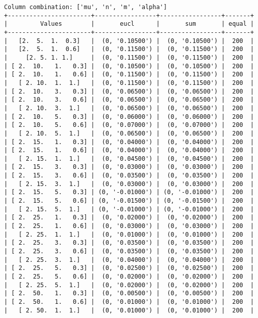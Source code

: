 \documentclass{article}
\begin{document}
\begin{verbatim}
Column combination: ['mu', 'n', 'm', 'alpha']
+-----------------------+-----------------+-----------------+-------+
|         Values        |       eucl      |       sum       | equal |
+-----------------------+-----------------+-----------------+-------+
|   [2.  5.  1.  0.3]   |  (0, '0.10500') |  (0, '0.10500') |  200  |
|   [2.  5.  1.  0.6]   |  (0, '0.11500') |  (0, '0.11500') |  200  |
|     [2. 5. 1. 1.]     |  (0, '0.11500') |  (0, '0.11500') |  200  |
| [ 2.  10.   1.   0.3] |  (0, '0.10500') |  (0, '0.10500') |  200  |
| [ 2.  10.   1.   0.6] |  (0, '0.11500') |  (0, '0.11500') |  200  |
|   [ 2. 10.  1.  1.]   |  (0, '0.11500') |  (0, '0.11500') |  200  |
| [ 2.  10.   3.   0.3] |  (0, '0.06500') |  (0, '0.06500') |  200  |
| [ 2.  10.   3.   0.6] |  (0, '0.06500') |  (0, '0.06500') |  200  |
|   [ 2. 10.  3.  1.]   |  (0, '0.06500') |  (0, '0.06500') |  200  |
| [ 2.  10.   5.   0.3] |  (0, '0.06000') |  (0, '0.06000') |  200  |
| [ 2.  10.   5.   0.6] |  (0, '0.07000') |  (0, '0.07000') |  200  |
|   [ 2. 10.  5.  1.]   |  (0, '0.06500') |  (0, '0.06500') |  200  |
| [ 2.  15.   1.   0.3] |  (0, '0.04000') |  (0, '0.04000') |  200  |
| [ 2.  15.   1.   0.6] |  (0, '0.04000') |  (0, '0.04000') |  200  |
|   [ 2. 15.  1.  1.]   |  (0, '0.04500') |  (0, '0.04500') |  200  |
| [ 2.  15.   3.   0.3] |  (0, '0.03000') |  (0, '0.03000') |  200  |
| [ 2.  15.   3.   0.6] |  (0, '0.03500') |  (0, '0.03500') |  200  |
|   [ 2. 15.  3.  1.]   |  (0, '0.03000') |  (0, '0.03000') |  200  |
| [ 2.  15.   5.   0.3] | (0, '-0.01000') | (0, '-0.01000') |  200  |
| [ 2.  15.   5.   0.6] | (0, '-0.01500') | (0, '-0.01500') |  200  |
|   [ 2. 15.  5.  1.]   | (0, '-0.01000') | (0, '-0.01000') |  200  |
| [ 2.  25.   1.   0.3] |  (0, '0.02000') |  (0, '0.02000') |  200  |
| [ 2.  25.   1.   0.6] |  (0, '0.03000') |  (0, '0.03000') |  200  |
|   [ 2. 25.  1.  1.]   |  (0, '0.01000') |  (0, '0.01000') |  200  |
| [ 2.  25.   3.   0.3] |  (0, '0.03500') |  (0, '0.03500') |  200  |
| [ 2.  25.   3.   0.6] |  (0, '0.03500') |  (0, '0.03500') |  200  |
|   [ 2. 25.  3.  1.]   |  (0, '0.04000') |  (0, '0.04000') |  200  |
| [ 2.  25.   5.   0.3] |  (0, '0.02500') |  (0, '0.02500') |  200  |
| [ 2.  25.   5.   0.6] |  (0, '0.02000') |  (0, '0.02000') |  200  |
|   [ 2. 25.  5.  1.]   |  (0, '0.02000') |  (0, '0.02000') |  200  |
| [ 2.  50.   1.   0.3] |  (0, '0.00500') |  (0, '0.00500') |  200  |
| [ 2.  50.   1.   0.6] |  (0, '0.01000') |  (0, '0.01000') |  200  |
|   [ 2. 50.  1.  1.]   |  (0, '0.01000') |  (0, '0.01000') |  200  |

\end{verbatim}
\end{document}
